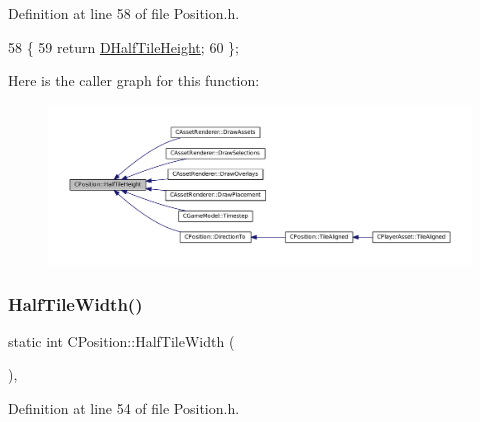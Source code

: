 Definition at line 58 of file Position.\+h.


\begin{DoxyCode}
58                                    \{
59             \textcolor{keywordflow}{return} \hyperlink{classCPosition_a1e0af68f7690b3cfc14687cf7fbe7ade}{DHalfTileHeight};  
60         \};
\end{DoxyCode}
Here is the caller graph for this function\+:
\nopagebreak
\begin{figure}[H]
\begin{center}
\leavevmode
\includegraphics[width=350pt]{classCPosition_a5e371060b1aa0d3d3c5df1e353e0e5fd_icgraph}
\end{center}
\end{figure}
\hypertarget{classCPosition_a4b799a0fb78ddd8bbd8548980e2458af}{}\label{classCPosition_a4b799a0fb78ddd8bbd8548980e2458af} 
\subsubsection{\texorpdfstring{Half\+Tile\+Width()}{HalfTileWidth()}}
{\footnotesize\ttfamily static int C\+Position\+::\+Half\+Tile\+Width (\begin{DoxyParamCaption}{ }\end{DoxyParamCaption})\hspace{0.3cm}{\ttfamily [inline]}, {\ttfamily [static]}}



Definition at line 54 of file Position.\+h.


